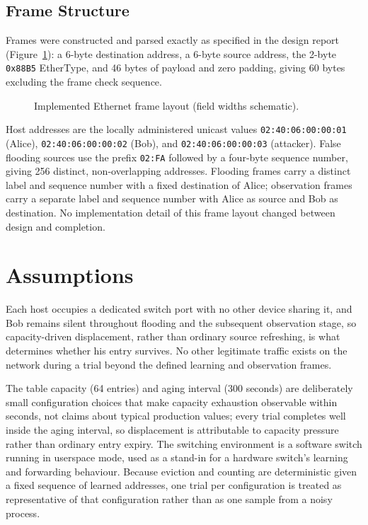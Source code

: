 \documentclass[10pt,a4paper]{article}
\begin{document}
\subsection{Frame Structure}
Frames were constructed and parsed exactly as specified in the design report (Figure~\ref{fig:frame}): a 6-byte destination address, a 6-byte source address, the 2-byte \texttt{0x88B5} EtherType, and 46 bytes of payload and zero padding, giving 60 bytes excluding the frame check sequence.

\begin{figure}[H]
\centering
{}
\caption{Implemented Ethernet frame layout (field widths schematic).}\label{fig:frame}
\end{figure}

Host addresses are the locally administered unicast values \texttt{02:40:06:00:00:01} (Alice), \texttt{02:40:06:00:00:02} (Bob), and \texttt{02:40:06:00:00:03} (attacker). False flooding sources use the prefix \texttt{02:FA} followed by a four-byte sequence number, giving 256 distinct, non-overlapping addresses. Flooding frames carry a distinct label and sequence number with a fixed destination of Alice; observation frames carry a separate label and sequence number with Alice as source and Bob as destination. No implementation detail of this frame layout changed between design and completion.

\section{Assumptions}\label{sec:assumptions}
Each host occupies a dedicated switch port with no other device sharing it, and Bob remains silent throughout flooding and the subsequent observation stage, so capacity-driven displacement, rather than ordinary source refreshing, is what determines whether his entry survives. No other legitimate traffic exists on the network during a trial beyond the defined learning and observation frames.

The table capacity (64 entries) and aging interval (300 seconds) are deliberately small configuration choices that make capacity exhaustion observable within seconds, not claims about typical production values; every trial completes well inside the aging interval, so displacement is attributable to capacity pressure rather than ordinary entry expiry. The switching environment is a software switch running in userspace mode, used as a stand-in for a hardware switch's learning and forwarding behaviour. Because eviction and counting are deterministic given a fixed sequence of learned addresses, one trial per configuration is treated as representative of that configuration rather than as one sample from a noisy process.
\end{document}
